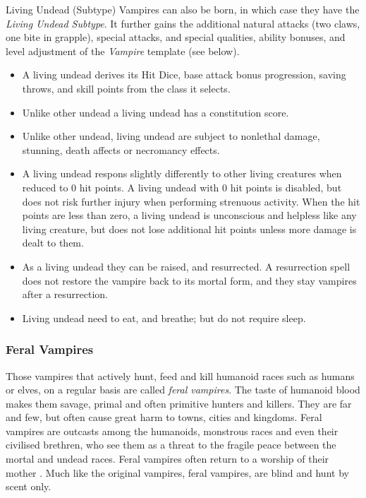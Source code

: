 \begin{35e}{Living Undead (Subtype)}
  Vampires can also be born, in which case they have the \emph{Living Undead
  Subtype}. It further gains the additional natural attacks (two claws, one
  bite in grapple), special attacks, and special qualities, ability bonuses,
  and level adjustment of the \emph{Vampire}  template (see below).

  \begin{itemize}[noitemsep]
    \item{A living undead derives its Hit Dice, base attack bonus progression,
      saving throws, and skill points from the class it selects.
    }
    \item{Unlike other undead a living undead has a constitution score.}
    \item{Unlike other undead, living undead are subject to nonlethal damage,
      stunning, death affects or necromancy effects.
    }
    \item{A living undead respons slightly differently to other living
      creatures when reduced to 0 hit points. A living undead with 0
      hit points is disabled, but does not risk further injury when
      performing strenuous activity. When the hit points are less than
      zero, a living undead is unconscious and helpless like any living
      creature, but does not lose additional hit points unless more damage
      is dealt to them.
    }
    \item{As a living undead they can be raised, and resurrected. A resurrection
      spell does not restore the vampire back to its mortal form, and they stay
      vampires after a resurrection.
    }
    \item{Living undead need to eat, and breathe; but do not require sleep.}
  \end{itemize}
\end{35e}

\subsubsection{Feral Vampires}
\label{sec:Feral Vampires}

Those vampires that actively hunt, feed and kill humanoid races such as
humans or elves, on a regular basis are called \emph{feral vampires}. The
taste of humanoid blood makes them savage, primal and often primitive hunters
and killers. They are far and few, but often cause great harm to towns, cities
and kingdoms. Feral vampires are outcasts among the humanoids, monstrous races
and even their civilised brethren, who see them as a threat to the fragile
peace between the mortal and undead races. Feral vampires often return to a
worship of their mother . Much like the original vampires,
feral vampires, are blind and hunt by scent only.

